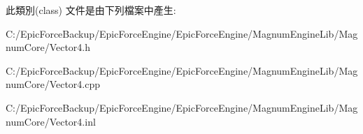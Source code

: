 此類別(class) 文件是由下列檔案中產生\+:\begin{DoxyCompactItemize}
\item 
C\+:/\+Epic\+Force\+Backup/\+Epic\+Force\+Engine/\+Epic\+Force\+Engine/\+Magnum\+Engine\+Lib/\+Magnum\+Core/Vector4.\+h\item 
C\+:/\+Epic\+Force\+Backup/\+Epic\+Force\+Engine/\+Epic\+Force\+Engine/\+Magnum\+Engine\+Lib/\+Magnum\+Core/Vector4.\+cpp\item 
C\+:/\+Epic\+Force\+Backup/\+Epic\+Force\+Engine/\+Epic\+Force\+Engine/\+Magnum\+Engine\+Lib/\+Magnum\+Core/Vector4.\+inl\end{DoxyCompactItemize}

